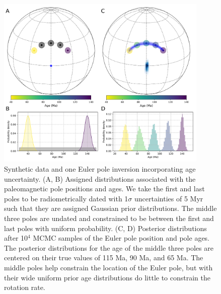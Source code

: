 \documentclass[]{agujournal2019}
\begin{document}
\begin{figure}
\centering
\includegraphics[width=0.9\textwidth]{fig_inversion_with_age_uncertainties.png}
\caption{Synthetic data and one Euler pole inversion incorporating age uncertainty. (A, B) Assigned distributions associated with the paleomagnetic pole positions and ages. We take the first and last poles to be radiometrically dated with 1$\sigma$ uncertainties of 5 Myr such that they are assigned Gaussian prior distributions. The middle three poles are undated and constrained to be between the first and last poles with uniform probability. (C, D) Posterior distributions after 10$^4$ MCMC samples of the Euler pole position and pole ages. The posterior distributions for the age of the middle three poles are centered on their true values of 115 Ma, 90 Ma, and 65 Ma. The middle poles help constrain the location of the Euler pole, but with their wide uniform prior age distributions do little to constrain the rotation rate.}
\label{fig:age_uncertainty_samples}
\end{figure}
\end{document}
